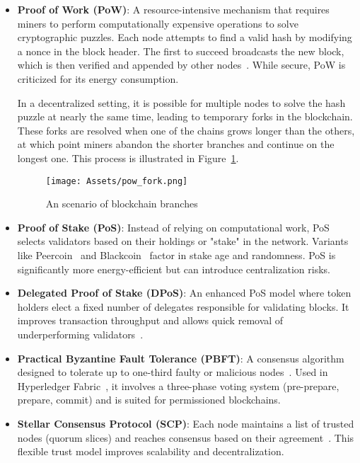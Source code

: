 \begin{itemize}
\item \textbf{Proof of Work (PoW)}: A resource-intensive mechanism that requires miners to perform computationally expensive operations to solve cryptographic puzzles. Each node attempts to find a valid hash by modifying a nonce in the block header. The first to succeed broadcasts the new block, which is then verified and appended by other nodes~\cite{nakamoto2008bitcoin}. While secure, PoW is criticized for its energy consumption.

In a decentralized setting, it is possible for multiple nodes to solve the hash puzzle at nearly the same time, leading to temporary forks in the blockchain. These forks are resolved when one of the chains grows longer than the others, at which point miners abandon the shorter branches and continue on the longest one. This process is illustrated in Figure~\ref{fig:pow_fork}.
\begin{figure}[H]
    \centering
    \texttt{[image: Assets/pow\_fork.png]}
    \caption{An scenario of blockchain branches}
    \label{fig:pow_fork}
\end{figure}

  \item \textbf{Proof of Stake (PoS)}: Instead of relying on computational work, PoS selects validators based on their holdings or "stake" in the network. Variants like Peercoin~\cite{king2012ppcoin} and Blackcoin~\cite{vasin2014blackcoin} factor in stake age and randomness. PoS is significantly more energy-efficient but can introduce centralization risks.

  \item \textbf{Delegated Proof of Stake (DPoS)}: An enhanced PoS model where token holders elect a fixed number of delegates responsible for validating blocks. It improves transaction throughput and allows quick removal of underperforming validators~\cite{bitshares2016}.

  \item \textbf{Practical Byzantine Fault Tolerance (PBFT)}: A consensus algorithm designed to tolerate up to one-third faulty or malicious nodes~\cite{castro1999pbft}. Used in Hyperledger Fabric~\cite{hyperledger2015}, it involves a three-phase voting system (pre-prepare, prepare, commit) and is suited for permissioned blockchains.

  \item \textbf{Stellar Consensus Protocol (SCP)}: Each node maintains a list of trusted nodes (quorum slices) and reaches consensus based on their agreement~\cite{mazieres2015stellar}. This flexible trust model improves scalability and decentralization.


\end{itemize}
